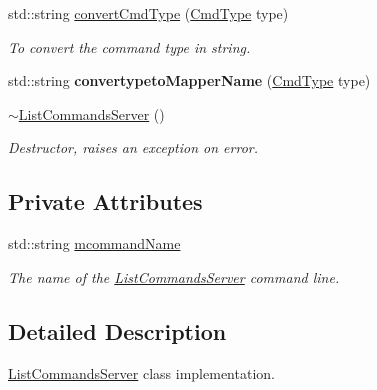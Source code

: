 \begin{DoxyCompactItemize}
std::string \hyperlink{classListCommandsServer_af253d25c235222b5872c31e590869a7a}{convertCmdType} (\hyperlink{namespacevishnu_a89462b396eca68c9c1a94a06d2f39532}{CmdType} type)
\begin{DoxyCompactList}\small\item\em To convert the command type in string. \item\end{DoxyCompactList}\item 
\hypertarget{classListCommandsServer_a6ce3767fe37e769c0e3402ed0574dbb8}{
std::string {\bfseries convertypetoMapperName} (\hyperlink{namespacevishnu_a89462b396eca68c9c1a94a06d2f39532}{CmdType} type)}
\label{classListCommandsServer_a6ce3767fe37e769c0e3402ed0574dbb8}

\item 
\hypertarget{classListCommandsServer_afad26228bcf19880e8280e2bf5a54cad}{
\hyperlink{classListCommandsServer_afad26228bcf19880e8280e2bf5a54cad}{$\sim$ListCommandsServer} ()}
\label{classListCommandsServer_afad26228bcf19880e8280e2bf5a54cad}

\begin{DoxyCompactList}\small\item\em Destructor, raises an exception on error. \item\end{DoxyCompactList}\end{DoxyCompactItemize}
\subsection*{Private Attributes}
\begin{DoxyCompactItemize}
\item 
\hypertarget{classListCommandsServer_a4587e9f6bf59c8fe3bc0b9635e8880fd}{
std::string \hyperlink{classListCommandsServer_a4587e9f6bf59c8fe3bc0b9635e8880fd}{mcommandName}}
\label{classListCommandsServer_a4587e9f6bf59c8fe3bc0b9635e8880fd}

\begin{DoxyCompactList}\small\item\em The name of the \hyperlink{classListCommandsServer}{ListCommandsServer} command line. \item\end{DoxyCompactList}\end{DoxyCompactItemize}


\subsection{Detailed Description}
\hyperlink{classListCommandsServer}{ListCommandsServer} class implementation. 

